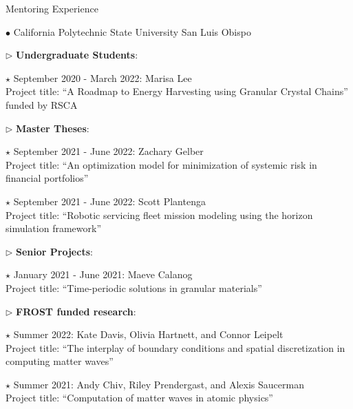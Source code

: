 \documentclass[10pt]{article} %
\newenvironment{outerlist}[1][\enskip\textbullet]%
        {\begin{itemize}[#1]}{\end{itemize}%
         \vspace{-.6\baselineskip}}
\newenvironment{innerlist}[1][\enskip\textbullet]%
        {\begin{compactitem}[#1]}{\end{compactitem}}
\begin{document}
\begin{section}{Mentoring Experience}
\begin{outerlist}

\item[$\bullet$] \vskip -7mm California Polytechnic State University San Luis Obispo

\begin{innerlist}
\item[$\triangleright$] \textbf{Undergraduate Students}:
\begin{innerlist}
\item[$\star$] September 2020 - March 2022: Marisa Lee\\
Project title: ``A Roadmap to Energy Harvesting using Granular Crystal Chains'' funded by RSCA
\end{innerlist}
\item[$\triangleright$] \textbf{Master Theses}:
\begin{innerlist}
\item[$\star$] September 2021 - June 2022: Zachary Gelber\\
Project title: ``An optimization model for minimization of systemic risk in financial portfolios''
\item[$\star$] September 2021 - June 2022: Scott Plantenga\\
Project title: ``Robotic servicing fleet mission modeling using the horizon simulation framework''
\end{innerlist}
\item[$\triangleright$] \textbf{Senior Projects}:
\begin{innerlist}
\item[$\star$] January 2021 - June 2021: Maeve Calanog\\
Project title: ``Time-periodic solutions in granular materials''
\end{innerlist}
\item[$\triangleright$] \textbf{FROST funded research}:
\begin{innerlist}
\item[$\star$] Summer 2022: Kate Davis, Olivia Hartnett, and Connor Leipelt\\
Project title: ``The interplay of boundary conditions and spatial discretization in computing matter waves''
\item[$\star$] Summer 2021: Andy Chiv, Riley Prendergast, and Alexis Saucerman\\
Project title: ``Computation of matter waves in atomic physics''

\end{innerlist}
\end{innerlist}
\end{outerlist}
\end{section}
\end{document}
